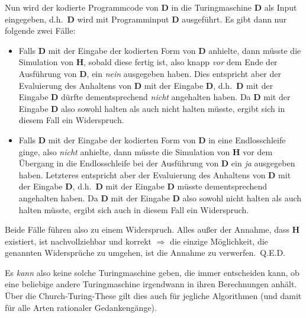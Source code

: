 \noindent Nun wird der kodierte Programmcode von $\mathbf{D}$ in die Turingmaschine $\mathbf{D}$ als Input eingegeben, d.h.\ $\mathbf{D}$ wird mit Programminput $\mathbf{D}$ ausgef\"{u}hrt. Es gibt dann nur folgende zwei F\"{a}lle:

\begin{itemize}
  \item Falls $\mathbf{D}$ mit der Eingabe der kodierten Form von $\mathbf{D}$ anhielte, dann m\"{u}sste die Simulation von $\mathbf{H}$, sobald diese fertig ist, also knapp \emph{vor} dem Ende der Ausf\"{u}hrung von $\mathbf{D}$, ein \emph{nein} ausgegeben haben. Dies entspricht aber der Evaluierung des Anhaltens von $\mathbf{D}$ mit der Eingabe $\mathbf{D}$, d.h.\ $\mathbf{D}$ mit der Eingabe $\mathbf{D}$ d\"{u}rfte dementsprechend \emph{nicht} angehalten haben. Da $\mathbf{D}$ mit der Eingabe $\mathbf{D}$ also sowohl halten als auch nicht halten m\"{u}sste, ergibt sich in diesem Fall ein Widerspruch.
  \item Falls $\mathbf{D}$ mit der Eingabe der kodierten Form von $\mathbf{D}$ in eine Endlosschleife ginge, also \emph{nicht} anhielte, dann m\"{u}sste die Simulation von $\mathbf{H}$ vor dem \"{U}bergang in die Endlos\-schleife bei der Ausf\"{u}hrung von $\mathbf{D}$ ein \emph{ja} ausgegeben haben. Letzteres entspricht aber der Evaluierung des Anhaltens von $\mathbf{D}$ mit der Eingabe $\mathbf{D}$, d.h.\ $\mathbf{D}$ mit der Eingabe $\mathbf{D}$ m\"{u}sste dementsprechend angehalten haben. Da $\mathbf{D}$ mit der Eingabe $\mathbf{D}$ also sowohl nicht halten als auch halten m\"{u}sste, ergibt sich auch in diesem Fall ein Widerspruch.
\end{itemize}

\noindent Beide F\"{a}lle f\"{u}hren also zu einem Widerspruch. Alles au{\ss}er der Annahme, dass $\mathbf{H}$ existiert, ist nachvollziehbar und korrekt $\Rightarrow$ die einzige M\"{o}glichkeit, die genannten Widerspr\"{u}che zu umgehen, ist die Annahme zu verwerfen.~Q.E.D.\newline

\noindent Es \emph{kann} also keine solche Turingmaschine geben, die immer entscheiden kann, ob eine beliebige andere Turingmaschine irgendwann in ihren Berechnungen anh\"{a}lt. \"{U}ber die Church-Turing-These gilt dies auch f\"{u}r jegliche Algorithmen (und damit f\"{u}r alle Arten rationaler Gedankeng\"{a}nge).

